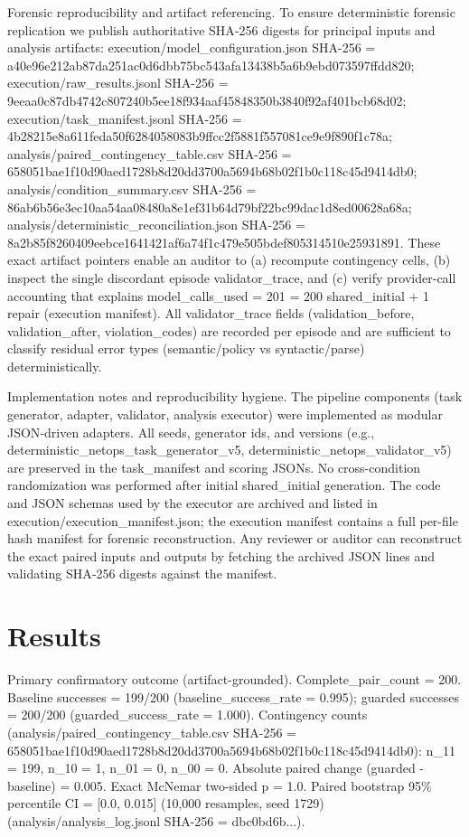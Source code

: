 \documentclass[conference]{IEEEtran}
\begin{document}
Forensic reproducibility and artifact referencing. To ensure deterministic forensic replication we publish authoritative SHA‑256 digests for principal inputs and analysis artifacts: execution/model\_configuration.json SHA-256 = a40e96e212ab87da251ac0d6dbb75bc543afa13438b5a6b9ebd073597ffdd820; execution/raw\_results.jsonl SHA-256 = 9eeaa0c87db4742c807240b5ee18f934aaf45848350b3840f92af401bcb68d02; execution/task\_manifest.jsonl SHA-256 = 4b28215e8a611feda50f6284058083b9ffcc2f5881f557081ce9e9f890f1c78a; analysis/paired\_contingency\_table.csv SHA-256 = 658051bae1f10d90aed1728b8d20dd3700a5694b68b02f1b0c118c45d9414db0; analysis/condition\_summary.csv SHA-256 = 86ab6b56e3ec10aa54aa08480a8e1ef31b64d79bf22bc99dac1d8ed00628a68a; analysis/deterministic\_reconciliation.json SHA-256 = 8a2b85f8260409eebce1641421af6a74f1c479e505bdef805314510e25931891. These exact artifact pointers enable an auditor to (a) recompute contingency cells, (b) inspect the single discordant episode validator\_trace, and (c) verify provider-call accounting that explains model\_calls\_used = 201 = 200 shared\_initial + 1 repair (execution manifest). All validator\_trace fields (validation\_before, validation\_after, violation\_codes) are recorded per episode and are sufficient to classify residual error types (semantic/policy vs syntactic/parse) deterministically.

Implementation notes and reproducibility hygiene. The pipeline components (task generator, adapter, validator, analysis executor) were implemented as modular JSON‑driven adapters. All seeds, generator ids, and versions (e.g., deterministic\_netops\_task\_generator\_v5, deterministic\_netops\_validator\_v5) are preserved in the task\_manifest and scoring JSONs. No cross-condition randomization was performed after initial shared\_initial generation. The code and JSON schemas used by the executor are archived and listed in execution/execution\_manifest.json; the execution manifest contains a full per-file hash manifest for forensic reconstruction. Any reviewer or auditor can reconstruct the exact paired inputs and outputs by fetching the archived JSON lines and validating SHA‑256 digests against the manifest.

\section{Results}
Primary confirmatory outcome (artifact-grounded). Complete\_pair\_count = 200. Baseline successes = 199/200 (baseline\_success\_rate = 0.995); guarded successes = 200/200 (guarded\_success\_rate = 1.000). Contingency counts (analysis/paired\_contingency\_table.csv SHA-256 = 658051bae1f10d90aed1728b8d20dd3700a5694b68b02f1b0c118c45d9414db0): n\_11 = 199, n\_10 = 1, n\_01 = 0, n\_00 = 0. Absolute paired change (guarded - baseline) = 0.005. Exact McNemar two-sided p = 1.0. Paired bootstrap 95\% percentile CI = [0.0, 0.015] (10,000 resamples, seed 1729) (analysis/analysis\_log.jsonl SHA-256 = dbc0bd6b...).
\end{document}
